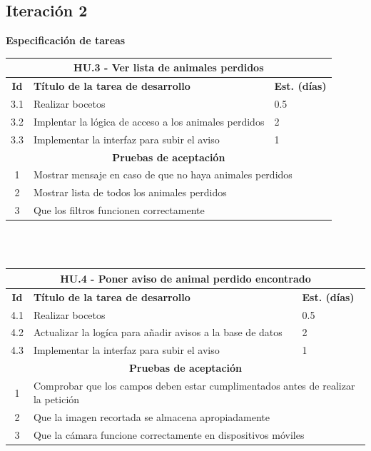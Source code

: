 \subsection{Iteración 2}
\large{\textbf{Especificación de tareas}} \\

\begin{tabular}{|c|p{9.5cm}|p{1cm}|}
	\hline
	\multicolumn{3}{|c|}{\textbf{HU.3 - Ver lista de animales perdidos}} \\
	\hline
	\textbf{Id} & \textbf{Título de la tarea de desarrollo} & \textbf{Est. (días)} \\
	\hline
	3.1 & Realizar bocetos & 0.5 \\ \hline
	3.2 &  Implentar la lógica de acceso a los animales perdidos & 2 \\ \hline
	3.3 &  Implementar la interfaz para subir el aviso & 1 \\ \hline
	\multicolumn{3}{|c|}{\textbf{Pruebas de aceptación}} \\ \hline
	1 & \multicolumn{2}{|l|}{Mostrar mensaje en caso de que no haya animales perdidos} \\ \hline
	2 & \multicolumn{2}{|l|}{Mostrar lista de todos los animales perdidos} \\ \hline
	3 & \multicolumn{2}{|l|}{Que los filtros funcionen correctamente} \\ \hline
\end{tabular} \\ \\


\begin{tabular}{|c|p{9.5cm}|p{1cm}|}
	\hline
	\multicolumn{3}{|c|}{\textbf{HU.4 - Poner aviso de animal perdido encontrado}} \\
	\hline
	\textbf{Id} & \textbf{Título de la tarea de desarrollo} & \textbf{Est. (días)} \\
	\hline
	4.1 & Realizar bocetos & 0.5 \\ \hline
	4.2 &  Actualizar la logíca para añadir avisos a la base de datos & 2 \\ \hline
	4.3 &  Implementar la interfaz para subir el aviso & 1 \\ \hline
	\multicolumn{3}{|c|}{\textbf{Pruebas de aceptación}} \\ \hline
	1 & \multicolumn{2}{|p{10cm}|}{Comprobar que los campos deben estar cumplimentados antes de realizar la petición} \\ \hline
	2 & \multicolumn{2}{|p{10cm}|}{Que la imagen recortada se almacena apropiadamente} \\ \hline
	3 & \multicolumn{2}{|p{10cm}|}{Que la cámara funcione correctamente en dispositivos móviles} \\ \hline
\end{tabular} \\ \\

